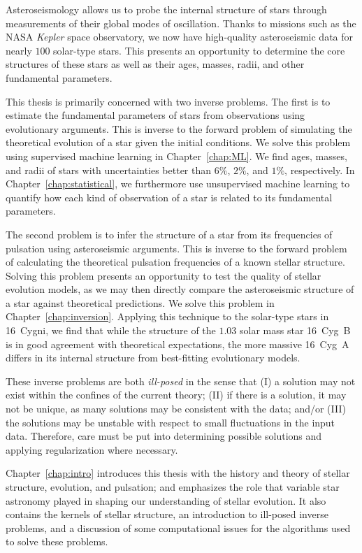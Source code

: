 Asteroseismology allows us to probe the internal structure of stars through measurements of their global modes of oscillation. 
Thanks to missions such as the NASA \emph{Kepler} space observatory, we now have high-quality asteroseismic data for nearly $100$ solar-type stars. 
This presents an opportunity to determine the core structures of these stars as well as their ages, masses, radii, and other fundamental parameters. 

This thesis is primarily concerned with two inverse problems. 
The first is to estimate the fundamental parameters of stars from observations using evolutionary arguments. 
This is inverse to the forward problem of simulating the theoretical evolution of a star given the initial conditions. 
We solve this problem using supervised machine learning in Chapter~\ref{chap:ML}. 
We find ages, masses, and radii of stars with uncertainties better than $6\%$, $2\%$, and $1\%$, respectively. 
In Chapter~\ref{chap:statistical}, we furthermore use unsupervised machine learning to quantify how each kind of observation of a star is related to its fundamental parameters. 

The second problem is to infer the structure of a star from its frequencies of pulsation using asteroseismic arguments. 
This is inverse to the forward problem of calculating the theoretical pulsation frequencies of a known stellar structure. 
Solving this problem presents an opportunity to test the quality of stellar evolution models, as we may then directly compare the asteroseismic structure of a star against theoretical predictions. 
We solve this problem in Chapter~\ref{chap:inversion}. 
Applying this technique to the solar-type stars in 16~Cygni, we find that while the structure of the $1.03$ solar mass star 16~Cyg~B is in good agreement with theoretical expectations, the more massive 16~Cyg~A differs in its internal structure from best-fitting evolutionary models. 

These inverse problems are both \emph{ill-posed} in the sense that (I) a solution may not exist within the confines of the current theory; (II) if there is a solution, it may not be unique, as many solutions may be consistent with the data; and/or (III) the solutions may be unstable with respect to small fluctuations in the input data. 
Therefore, care must be put into determining possible solutions and applying regularization where necessary. 

Chapter~\ref{chap:intro} introduces this thesis with the history and theory of stellar structure, evolution, and pulsation; and emphasizes the role that variable star astronomy played in shaping our understanding of stellar evolution. 
It also contains the kernels of stellar structure, an introduction to ill-posed inverse problems, and a discussion of some computational issues for the algorithms used to solve these problems. 
